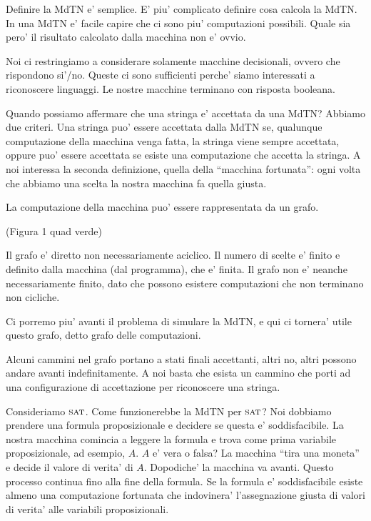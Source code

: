 Definire la MdTN e' semplice. E' piu' complicato definire cosa calcola la MdTN. In una MdTN e'
facile capire che ci sono piu' computazioni possibili. Quale sia pero' il risultato calcolato dalla
macchina non e' ovvio.

Noi ci restringiamo a considerare solamente macchine decisionali, ovvero che rispondono si'/no.
Queste ci sono sufficienti perche' siamo interessati a riconoscere linguaggi. Le nostre macchine
terminano con risposta booleana.

Quando possiamo affermare che una stringa e' accettata da una MdTN? Abbiamo due criteri. Una stringa
puo' essere accettata dalla MdTN se, qualunque computazione della macchina venga fatta, la stringa
viene sempre accettata, oppure puo' essere accettata se esiste una computazione che accetta la
stringa. A noi interessa la seconda definizione, quella della ``macchina fortunata'': ogni volta che
abbiamo una scelta la nostra macchina fa quella giusta.


La computazione della macchina puo' essere rappresentata da un grafo.

(Figura 1 quad verde)

Il grafo e' diretto non necessariamente aciclico. Il numero di scelte e' finito e definito dalla
macchina (dal programma), che e' finita. Il grafo non e' neanche necessariamente finito, dato che
possono esistere computazioni che non terminano non cicliche.

Ci porremo piu' avanti il problema di simulare la MdTN, e qui ci tornera' utile questo grafo, detto
grafo delle computazioni.

Alcuni cammini nel grafo portano a stati finali accettanti, altri no, altri possono andare avanti
indefinitamente. A noi basta che esista un cammino che porti ad una configurazione di accettazione
per riconoscere una stringa. 


Consideriamo $\textsc{sat}$. Come funzionerebbe la MdTN per $\textsc{sat}$? Noi dobbiamo prendere una formula
proposizionale e decidere se questa e' soddisfacibile. La nostra macchina comincia a leggere la
formula e trova come prima variabile proposizionale, ad esempio, $A$. $A$ e' vera o falsa? La
macchina ``tira una moneta'' e decide il valore di verita' di $A$. Dopodiche' la macchina va avanti.
Questo processo continua fino alla fine della formula. Se la formula e' soddisfacibile esiste almeno
una computazione fortunata che indovinera' l'assegnazione giusta di valori di verita' alle variabili
proposizionali.


